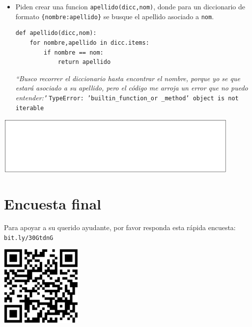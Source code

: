 \begin{itemize}
    \item Piden crear una funcion \texttt{apellido(dicc,nom)}, donde para un diccionario de formato \texttt{\{nombre:apellido\}} se busque el apellido asociado a \texttt{nom}.
  \begin{lstlisting}[style=consola]
def apellido(dicc,nom):
    for nombre,apellido in dicc.items:
        if nombre == nom:
            return apellido
\end{lstlisting}
    \textit{``Busco recorrer el diccionario hasta encontrar el nombre, porque yo se que estará asociado a su apellido, pero el código me arroja un error que no puedo entender:"} \texttt{TypeError: 'builtin\_function\_or \_method' object is not iterable}
\end{itemize}
\begin{center}
 \includegraphics[width=0.9\textwidth]{Imagenes/blanco.PNG}   
\end{center}
\section{Encuesta final}
Para apoyar a su querido ayudante, por favor responda esta rápida encuesta: \texttt{bit.ly/30GtdnG} 
\begin{center}
\includegraphics[width=0.3\textwidth]{Imagenes/QR.PNG}
\end{center}



